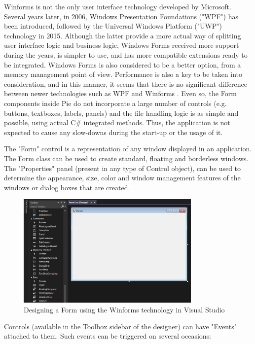 Winforms is not the only user interface technology developed by Microsoft. Several years later, in 2006, Windows Presentation Foundations ("WPF") has been introduced, followed by the Universal Windows Platform ("UWP") technology in 2015. Although the latter provide a more actual way of splitting user interface logic and business logic, Windows Forms received more support during the years, is simpler to use, and has more compatible extensions ready to be integrated. Windows Forms is also considered to be a better option, from a memory management point of view. Performance is also a key to be taken into consideration, and in this manner, it seems that there is no significant difference between newer technologies such as WPF and Winforms \cite{han2023optimization}. Even so, the Form components inside Pie do not incorporate a large number of controls (e.g. buttons, textboxes, labels, panels) and the file handling logic is as simple and possible, using actual C\# integrated methods. Thus, the application is not expected to cause any slow-downs during the start-up or the usage of it.

The "Form" control is a representation of any window displayed in an application. The Form class can be used to create standard, floating and borderless windows. The "Properties" panel (present in any type of Control object), can be used to determine the appearance, size, color and window management features of the windows or dialog boxes that are created. \cite{form-class}

\begin{figure}[H]
\centering
\includegraphics[width=0.8\textwidth]{images/winforms-designer.png}
\caption{Designing a Form using the Winforms technology in Visual Studio}
\label{fig:fig2,1.}
\end{figure}

Controls (available in the Toolbox sidebar of the designer) can have "Events" attached to them. Such events can be triggered on several occasions:

